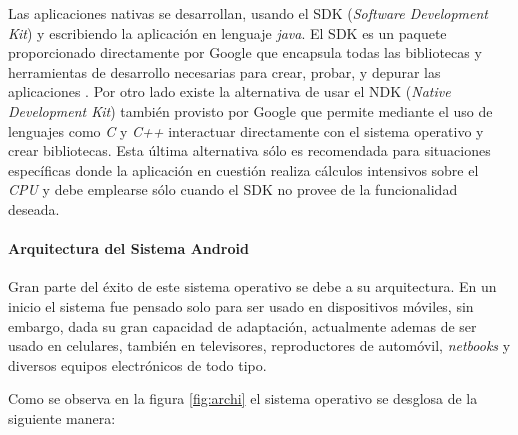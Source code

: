 Las aplicaciones nativas se desarrollan, usando el SDK (\textit{Software Development Kit}) y escribiendo la aplicación en lenguaje \textit{java}. El SDK es un paquete proporcionado directamente por Google que encapsula todas las bibliotecas y herramientas de desarrollo necesarias para crear, probar, y depurar las aplicaciones \cite{ASDK}. Por otro lado existe la alternativa de usar el NDK (\textit{Native Development Kit}) también provisto por Google que permite mediante el uso de lenguajes como \textit{C} y \textit{C++} interactuar directamente con el sistema operativo y crear bibliotecas. Esta última alternativa sólo es recomendada para situaciones específicas donde la aplicación en cuestión realiza cálculos intensivos sobre el \textit{CPU} y debe emplearse sólo cuando el SDK no provee de la funcionalidad deseada\cite{ANDK}.

\paragraph{Arquitectura del Sistema Android}\mbox{}

Gran parte del éxito de este sistema operativo se debe a su arquitectura. En un inicio el sistema fue pensado solo para ser usado en dispositivos móviles, sin embargo, dada su gran capacidad de adaptación, actualmente ademas de ser usado en celulares, también en televisores, reproductores de automóvil, \textit{netbooks} y diversos equipos electrónicos de todo tipo.

Como se observa en la figura \ref{fig:archi} el sistema operativo se desglosa de la siguiente manera:

